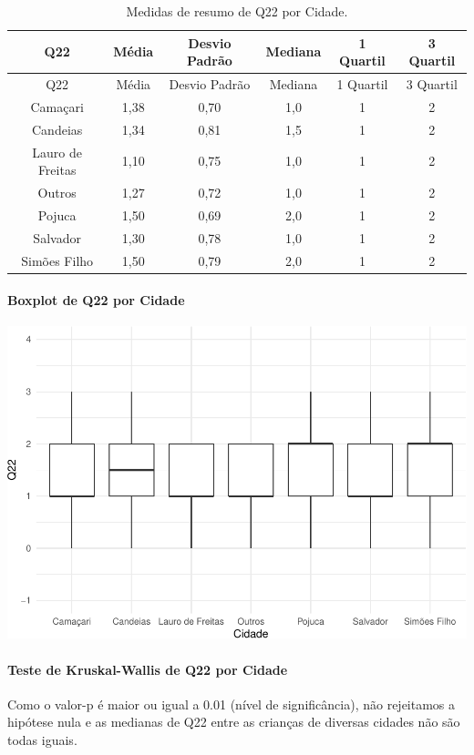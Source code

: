 \documentclass[]{article}
\let\oldparagraph\paragraph
\renewcommand{\paragraph}[1]{\oldparagraph{#1}\mbox{}}
\begin{document}
\begin{longtable}[]{@{}cccccc@{}}
\caption{\label{tab:unnamed-chunk-488}Medidas de resumo de Q22 por Cidade.}\tabularnewline
\toprule
Q22 & Média & Desvio Padrão & Mediana & 1 Quartil & 3 Quartil\tabularnewline
\midrule
\endfirsthead
\toprule
Q22 & Média & Desvio Padrão & Mediana & 1 Quartil & 3 Quartil\tabularnewline
\midrule
\endhead
Camaçari & 1,38 & 0,70 & 1,0 & 1 & 2\tabularnewline
Candeias & 1,34 & 0,81 & 1,5 & 1 & 2\tabularnewline
Lauro de Freitas & 1,10 & 0,75 & 1,0 & 1 & 2\tabularnewline
Outros & 1,27 & 0,72 & 1,0 & 1 & 2\tabularnewline
Pojuca & 1,50 & 0,69 & 2,0 & 1 & 2\tabularnewline
Salvador & 1,30 & 0,78 & 1,0 & 1 & 2\tabularnewline
Simões Filho & 1,50 & 0,79 & 2,0 & 1 & 2\tabularnewline
\bottomrule
\end{longtable}

\hypertarget{boxplot-de-q22-por-cidade}{%
\paragraph{Boxplot de Q22 por Cidade}\label{boxplot-de-q22-por-cidade}}

\begin{center}\includegraphics[width=0.75\linewidth]{relatorio_covid19_files/figure-latex/unnamed-chunk-489-1} \end{center}

\hypertarget{teste-de-kruskal-wallis-de-q22-por-cidade}{%
\paragraph{Teste de Kruskal-Wallis de Q22 por Cidade}\label{teste-de-kruskal-wallis-de-q22-por-cidade}}

Como o valor-p é maior ou igual a 0.01 (nível de significância), não rejeitamos a hipótese nula e as medianas de Q22 entre as crianças de diversas cidades não são todas iguais.
\end{document}
